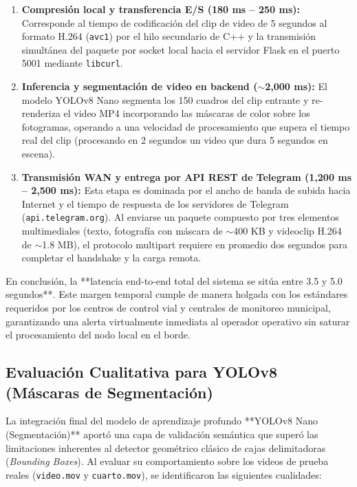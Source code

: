 \documentclass[12pt]{article}
\begin{document}
\begin{enumerate}
    \item \textbf{Compresión local y transferencia E/S (180 ms -- 250 ms):} Corresponde al tiempo de codificación del clip de video de 5 segundos al formato H.264 (\texttt{avc1}) por el hilo secundario de C++ y la transmisión simultánea del paquete por socket local hacia el servidor Flask en el puerto 5001 mediante \texttt{libcurl}.
    \item \textbf{Inferencia y segmentación de video en backend ($\sim$2,000 ms):} El modelo YOLOv8 Nano segmenta los 150 cuadros del clip entrante y re-renderiza el video MP4 incorporando las máscaras de color sobre los fotogramas, operando a una velocidad de procesamiento que supera el tiempo real del clip (procesando en 2 segundos un video que dura 5 segundos en escena).
    \item \textbf{Transmisión WAN y entrega por API REST de Telegram (1,200 ms -- 2,500 ms):} Esta etapa es dominada por el ancho de banda de subida hacia Internet y el tiempo de respuesta de los servidores de Telegram (\texttt{api.telegram.org}). Al enviarse un paquete compuesto por tres elementos multimediales (texto, fotografía con máscara de $\sim$400 KB y videoclip H.264 de $\sim$1.8 MB), el protocolo multipart requiere en promedio dos segundos para completar el handshake y la carga remota.
\end{enumerate}

En conclusión, la **latencia end-to-end total del sistema se sitúa entre 3.5 y 5.0 segundos**. Este margen temporal cumple de manera holgada con los estándares requeridos por los centros de control vial y centrales de monitoreo municipal, garantizando una alerta virtualmente inmediata al operador operativo sin saturar el procesamiento del nodo local en el borde.

\subsection{Evaluación Cualitativa para YOLOv8 (Máscaras de Segmentación)}
La integración final del modelo de aprendizaje profundo **YOLOv8 Nano (Segmentación)** aportó una capa de validación semántica que superó las limitaciones inherentes al detector geométrico clásico de cajas delimitadoras (\emph{Bounding Boxes}). Al evaluar su comportamiento sobre los videos de prueba reales (\texttt{video.mov} y \texttt{cuarto.mov}), se identificaron las siguientes cualidades:
\end{document}

